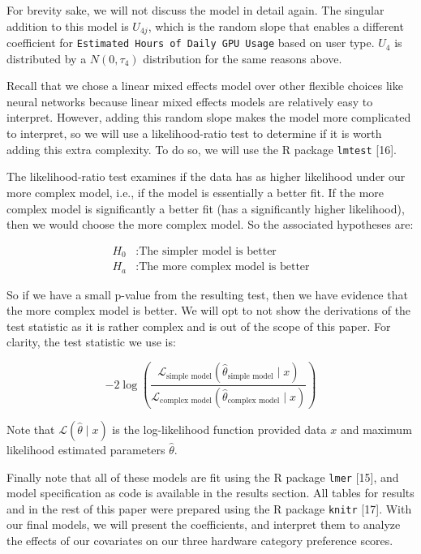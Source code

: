 \documentclass[
]{article}
\begin{document}
For brevity sake, we will not discuss the model in detail again. The
singular addition to this model is \(U_{4j}\), which is the random slope
that enables a different coefficient for
\texttt{Estimated\ Hours\ of\ Daily\ GPU\ Usage} based on user type.
\(U_4\) is distributed by a \(N(0, \tau_4)\) distribution for the same
reasons above.

Recall that we chose a linear mixed effects model over other flexible
choices like neural networks because linear mixed effects models are
relatively easy to interpret. However, adding this random slope makes
the model more complicated to interpret, so we will use a
likelihood-ratio test to determine if it is worth adding this extra
complexity. To do so, we will use the R package \texttt{lmtest}
{[}16{]}.

The likelihood-ratio test examines if the data has as higher likelihood
under our more complex model, i.e., if the model is essentially a better
fit. If the more complex model is significantly a better fit (has a
significantly higher likelihood), then we would choose the more complex
model. So the associated hypotheses are:

\[
\begin{aligned}
H_{0}&: \text{The simpler model is better} \\
H_{a}&: \text{The more complex model is better}
\end{aligned}
\]

So if we have a small p-value from the resulting test, then we have
evidence that the more complex model is better. We will opt to not show
the derivations of the test statistic as it is rather complex and is out
of the scope of this paper. For clarity, the test statistic we use is:

\[
-2 \log(\frac{\mathcal{L}_{\text{simple model}}(\hat{\theta}_{\text{simple model}}\mid x)}{\mathcal{L}_{\text{complex model}}(\hat{\theta}_{\text{complex model}} \mid x)})
\]

Note that \(\mathcal{L}(\hat{\theta} \mid x)\) is the log-likelihood
function provided data \(x\) and maximum likelihood estimated parameters
\(\hat{\theta}\).

Finally note that all of these models are fit using the R package
\texttt{lmer} {[}15{]}, and model specification as code is available in
the results section. All tables for results and in the rest of this
paper were prepared using the R package \texttt{knitr} {[}17{]}. With
our final models, we will present the coefficients, and interpret them
to analyze the effects of our covariates on our three hardware category
preference scores.
\end{document}
